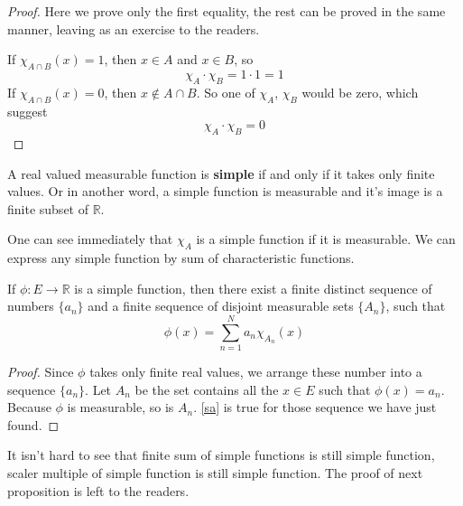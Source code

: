 \documentclass[lang=en, 12pt]{elegantbook}
\newcommand{\RR}{\mathbb{R}}
\begin{document}
                \begin{proof}
                    Here we prove only the first equality, the rest can be proved in the same manner, leaving as an exercise to the readers.\par
                    If $\chi_{A \cap B}(x) = 1$, then $x \in A$ and $x\in B$, so 
                $$\chi_A \cdot \chi_B = 1 \cdot 1 = 1$$
                If $\chi_{A \cap B}(x) = 0$, then $x \notin A \cap B$. So one of $\chi_A$, $\chi_B$ would be zero, which suggest 
                $$\chi_A \cdot \chi_B = 0$$ \par                   
                \end{proof}
                \begin{definition}
                    A real valued measurable function is \textbf{simple} if and only if it takes only finite values.
                Or in another word, a simple function is measurable and it's image is a finite subset of $\RR$.
                \end{definition}
                One can see immediately that $\chi_A$ is a simple function if it is measurable. We can express any simple function by sum 
            of characteristic functions.
                \begin{proposition}
                    If $\phi:E \to \RR$ is a simple function, then there exist a finite distinct sequence of numbers $\{a_n\}$ and a finite sequence of disjoint measurable sets $\{A_n\}$,
                such that 
                    \begin{equation}
                        \phi(x) = \sum_{n=1}^{N} a_n \chi_{A_n}(x) \label{sa}
                    \end{equation} 
                \end{proposition}
                \begin{proof}
                    Since $\phi$ takes only finite real values, we arrange these number into a sequence $\{a_n\}$. 
                Let $A_n$ be the set contains all the $x \in E$ such that $\phi(x) = a_n$. Because $\phi$ is measurable, so is $A_n$.
                \eqref{sa} is true for those sequence we have just found.
                \end{proof}
                It isn't hard to see that finite sum of simple functions is still simple function, scaler multiple of simple function is still simple 
            function. The proof of next proposition is left to the readers.
\end{document}
